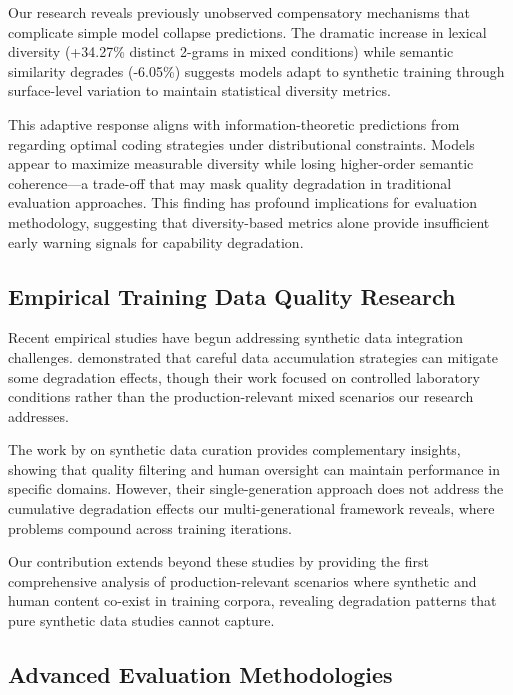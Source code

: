 \documentclass{article}
\begin{document}
Our research reveals previously unobserved compensatory mechanisms that complicate simple model collapse predictions. The dramatic increase in lexical diversity (+34.27\% distinct 2-grams in mixed conditions) while semantic similarity degrades (-6.05\%) suggests models adapt to synthetic training through surface-level variation to maintain statistical diversity metrics.

This adaptive response aligns with information-theoretic predictions from \citet{cover1999elements} regarding optimal coding strategies under distributional constraints. Models appear to maximize measurable diversity while losing higher-order semantic coherence—a trade-off that may mask quality degradation in traditional evaluation approaches. This finding has profound implications for evaluation methodology, suggesting that diversity-based metrics alone provide insufficient early warning signals for capability degradation.

\subsection{Empirical Training Data Quality Research}

Recent empirical studies have begun addressing synthetic data integration challenges. \citet{gerstgrasser2024model} demonstrated that careful data accumulation strategies can mitigate some degradation effects, though their work focused on controlled laboratory conditions rather than the production-relevant mixed scenarios our research addresses.

The work by \citet{borji2022pros} on synthetic data curation provides complementary insights, showing that quality filtering and human oversight can maintain performance in specific domains. However, their single-generation approach does not address the cumulative degradation effects our multi-generational framework reveals, where problems compound across training iterations.

Our contribution extends beyond these studies by providing the first comprehensive analysis of production-relevant scenarios where synthetic and human content co-exist in training corpora, revealing degradation patterns that pure synthetic data studies cannot capture.

\subsection{Advanced Evaluation Methodologies}
\end{document}
